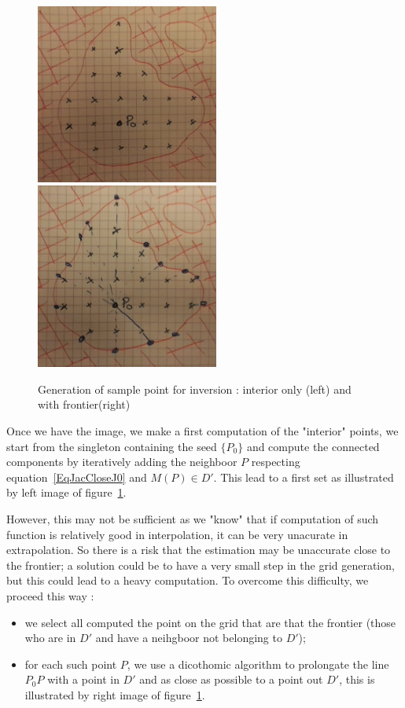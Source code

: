 \begin{figure}
\centering
\includegraphics[width=6cm]{Programmer/PointInver-Interior.jpg}
\includegraphics[width=6cm]{Programmer/PointInver-WFront.jpg}
\caption{Generation of sample point for inversion : interior only (left) and with frontier(right)}
\label{fig:PointInvGen}
\end{figure}


Once we have the image, we make a first computation of the "interior" points,
we start from the singleton containing the seed $\{P_0\}$ and compute the connected 
components by iteratively adding the neighboor $P$ respecting equation~\ref{EqJacCloseJ0}
and  $M(P) \in D'$.  This lead to a first set as illustrated by left image 
of figure~\ref{fig:PointInvGen}.

However, this may not be sufficient as we "know" that if computation of such function
is relatively good in interpolation, it can be very unacurate in extrapolation. So there
is a risk that the estimation may be unaccurate close to the frontier; a solution
could be to have a very small step in the grid generation, but this could lead to
a heavy computation.  To overcome this difficulty, we proceed this way :

\begin{itemize}
    \item we select all computed the point on the grid that are that the frontier
          (those who are in $D'$ and  have a neihgboor not belonging to $D'$);

    \item  for each such point $P$,  we use a dicothomic algorithm to prolongate the
	   line $P_0P$ with a point in $D'$ and as close as possible to a point out $D'$,
           this is illustrated by right image of figure~\ref{fig:PointInvGen}.
\end{itemize}


